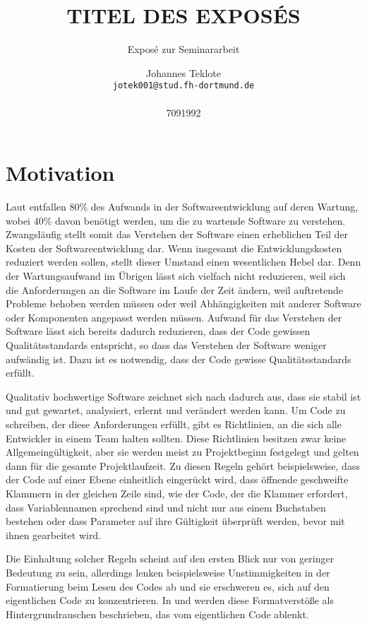 \documentclass[fontsize=11pt, paper=a4, parskip=half]{scrartcl}
\title{
	TITEL DES EXPOSÉS
}
\subtitle{Exposé zur Seminararbeit}
\author{
	Johannes Teklote
	\\
	\texttt{jotek001@stud.fh-dortmund.de}
	\\ \\
	{7091992}
}
\begin{document}
\maketitle

\section{Motivation}
Laut \cite{Balzert2009} entfallen 80\% des Aufwands in der Softwareentwicklung auf deren Wartung, wobei 40\% davon benötigt werden, um die zu wartende Software zu verstehen.
Zwangsläufig stellt somit das Verstehen der Software einen erheblichen Teil der Kosten der Softwareentwicklung dar. 
Wenn insgesamt die Entwicklungskosten reduziert werden sollen, stellt dieser Umstand einen wesentlichen Hebel dar.
Denn der Wartungsaufwand im Übrigen lässt sich vielfach nicht reduzieren, weil sich die Anforderungen an die Software im Laufe der Zeit ändern, weil auftretende Probleme behoben werden müssen oder weil Abhängigkeiten mit anderer Software oder Komponenten angepasst werden müssen.
Aufwand für das Verstehen der Software lässt sich bereits dadurch reduzieren, dass der Code gewissen Qualitätsstandards entspricht, so dass das Verstehen der Software weniger aufwändig ist.
Dazu ist es notwendig, dass der Code gewisse Qualitätsstandards erfüllt.

Qualitativ hochwertige Software zeichnet sich nach \cite{ISO-25010} dadurch aus, dass sie stabil ist und gut gewartet, analysiert, erlernt und verändert werden kann.
Um Code zu schreiben, der diese Anforderungen erfüllt, gibt es Richtlinien, an die sich alle Entwickler in einem Team halten sollten.
Diese Richtlinien besitzen zwar keine Allgemeingültigkeit, aber sie werden meist zu Projektbeginn festgelegt und gelten dann für die gesamte Projektlaufzeit.
Zu diesen Regeln gehört beispielsweise, dass der Code auf einer Ebene einheitlich eingerückt wird, dass öffnende geschweifte Klammern in der gleichen Zeile sind, wie der Code, der die Klammer erfordert, dass Variablennamen sprechend sind und nicht nur aus einem Buchstaben bestehen oder dass Parameter auf ihre Gültigkeit überprüft werden, bevor mit ihnen gearbeitet wird.

Die Einhaltung solcher Regeln scheint auf den ersten Blick nur von geringer Bedeutung zu sein, allerdings lenken beispielsweise Unstimmigkeiten in der Formatierung beim Lesen des Codes ab und sie erschweren es, sich auf den eigentlichen Code zu konzentrieren.
In \cite{PJ2015} und \cite{SP2011} werden diese Formatverstöße als Hintergrundrauschen beschrieben, das vom eigentlichen Code ablenkt. 
\end{document}
